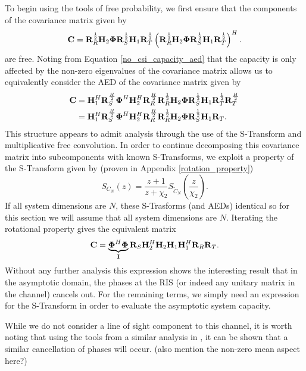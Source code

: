 To begin using the tools of free probability, we first ensure that the components of the covariance matrix given by 
	\begin{equation}
	\mathbf{C} = \mathbf{R}_{R}^{\frac{1}{2}}\mathbf{H}_{2}\boldsymbol{\Phi} \mathbf{R}_{S}^{\frac{1}{2}}\mathbf{H}_{1}\mathbf{R}_{T}^{\frac{1}{2}}
	\left(\mathbf{R}_{R}^{\frac{1}{2}}\mathbf{H}_{2}\boldsymbol{\Phi} \mathbf{R}_{S}^{\frac{1}{2}}\mathbf{H}_{1}\mathbf{R}_{T}^{\frac{1}{2}}\right)^H.
	\end{equation}
are free. 
Noting from Equation \eqref{no_csi_capacity_aed} that the capacity is only affected by the non-zero eigenvalues of the covariance matrix allows us to equivalently 
consider the AED of the covariance matrix given by 
	\begin{align}
	\mathbf{C} &  =  \mathbf{H}_{1}^H \mathbf{R}_{S}^{\frac{H}{2}}\boldsymbol{\Phi}^H \mathbf{H}_{2}^H \mathbf{R}_{R}^{\frac{H}{2}}
	 \mathbf{R}_{R}^{\frac{1}{2}}\mathbf{H}_{2}\boldsymbol{\Phi} \mathbf{R}_{S}^{\frac{1}{2}}\mathbf{H}_{1}\mathbf{R}_{T}^{\frac{1}{2}}\mathbf{R}_{T}^{\frac{H}{2}}
	 \\
	 &  =  
	 \mathbf{H}_{1}^H \mathbf{R}_{S}^{\frac{H}{2}}\boldsymbol{\Phi}^H \mathbf{H}_{2}^H \mathbf{R}_{R}^{\frac{H}{2}}
	 \mathbf{R}_{R}^{\frac{1}{2}}\mathbf{H}_{2}\boldsymbol{\Phi} \mathbf{R}_{S}^{\frac{1}{2}}\mathbf{H}_{1}\mathbf{R}_{T}.
	\end{align}
This structure appears to admit analysis through the use of the S-Transform and multiplicative free convolution. In order to continue decomposing this covariance matrix into subcomponents  with known S-Transforms, we exploit a property of the S-Transform given by (proven in Appendix \ref{rotation_property})
\begin{equation}
S_{C_N}(z) = \frac{z+1}{z+\chi_2} S_{\tilde{C}_N}(\frac{z}{\chi_2}).
\end{equation}
If all system dimensions are $N$, these S-Trasforms (and AEDs) identical so for this section we will assume that all system dimensions are $N$.
Iterating the rotational property gives the equivalent matrix
	\begin{equation}
	\mathbf{C} =
\underbrace{\boldsymbol{\Phi}^H \boldsymbol{\Phi}}_{\mathbf{I}}
	\mathbf{R}_{S}
	 \mathbf{H}_{2}^H \mathbf{H}_{2}
	 \mathbf{H}_{1}\mathbf{H}_{1}^H 
	  \mathbf{R}_{R}
	 \mathbf{R}_{T}.
	\end{equation}
Without any further analysis this expression shows the interesting result that in the asymptotic domain, the phases at the RIS (or indeed any unitary matrix in the channel) cancels out. For the remaining terms, we simply need an expression for the S-Transform in order to evaluate the asymptotic system capacity.
\par 
While we do not consider a line of sight component to this channel, it is worth noting that using the tools from a similar analysis in \cite{}, it can be shown that 
a similar cancellation of phases will occur. 
(also mention the non-zero mean aspect here?)


